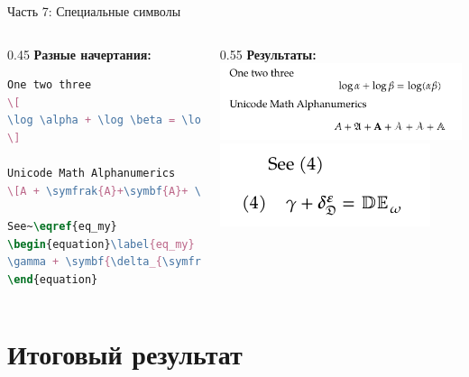\documentclass[aspectratio=169]{beamer}
\begin{document}
\begin{frame}[fragile]{Часть 7: Специальные символы}
    \begin{columns}[T]
        \begin{column}{0.45\textwidth}
            \textbf{Разные начертания:}
            \begin{lstlisting}[language=tex]
One two three
\[
\log \alpha + \log \beta = \log(\alpha\beta)
\]

Unicode Math Alphanumerics
\[A + \symfrak{A}+\symbf{A}+ \symcal{A} + \symscr{A}+\symbb{A}\]

See~\eqref{eq_my}
\begin{equation}\label{eq_my}
\gamma + \symbf{\delta_{\symfrak{D}}^{\symcal{\varepsilon}}} = \symbb{DE}_{\symscr{\omega}}
\end{equation}
            \end{lstlisting}
        \end{column}
        \begin{column}{0.55\textwidth}
            \textbf{Результаты:}
            \includegraphics[width=\textwidth, keepaspectratio]{image/6.png}
            \includegraphics[width=\textwidth, keepaspectratio]{image/7.png}
        \end{column}
    \end{columns}
\end{frame}

\section{Итоговый результат}
\end{document}
